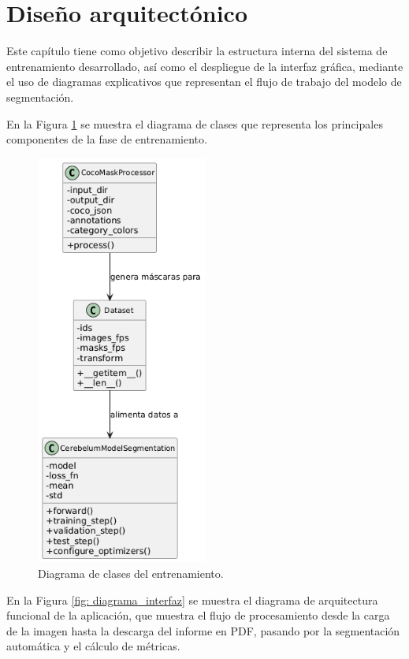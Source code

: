 
\section{Diseño arquitectónico}
Este capítulo tiene como objetivo describir la estructura interna del sistema de entrenamiento desarrollado, así como el despliegue de la interfaz gráfica, mediante el uso de diagramas explicativos que representan el flujo de trabajo del modelo de segmentación.

En la Figura \ref{fig: diagrama_de_clases} se muestra el diagrama de clases que representa los principales componentes de la fase de entrenamiento.
\begin{figure}[h]
    \centering
    \includegraphics[width=0.5\textwidth]{img/diagrama1.png}
    \caption{Diagrama de clases del entrenamiento.}
    \label{fig: diagrama_de_clases}
\end{figure}

En la Figura \ref{fig: diagrama_interfaz} se muestra el diagrama de arquitectura funcional de la aplicación, que muestra el flujo de procesamiento desde la carga de la imagen hasta la descarga del informe en PDF, pasando por la segmentación automática y el cálculo de métricas.

